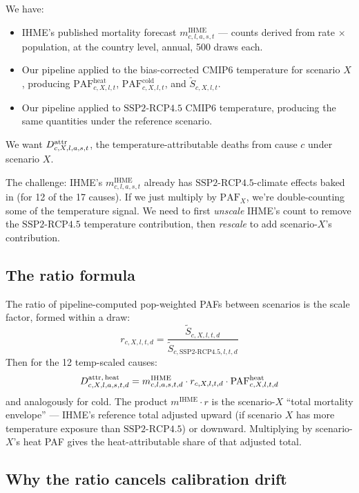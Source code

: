 \documentclass[11pt]{article}
\newcommand{\PAF}{\text{PAF}}
\newcommand{\SSPtwo}{\text{SSP2{-}RCP4.5}}
\newcommand{\mIHME}{m^{\text{IHME}}}
\begin{document}
We have:
\begin{itemize}[itemsep=2pt]
  \item IHME's published mortality forecast $\mIHME_{c,l,a,s,t}$ ---
    counts derived from rate $\times$ population, at the country level,
    annual, 500 draws each.
  \item Our pipeline applied to the bias-corrected CMIP6 temperature for
    scenario $X$, producing $\PAF^{\text{heat}}_{c,X,l,t}$,
    $\PAF^{\text{cold}}_{c,X,l,t}$, and $\tilde S_{c,X,l,t}$.
  \item Our pipeline applied to $\SSPtwo$ CMIP6 temperature, producing
    the same quantities under the reference scenario.
\end{itemize}

We want $\mAttr_{c,X,l,a,s,t}$, the temperature-attributable deaths from
cause $c$ under scenario $X$.

The challenge: IHME's $\mIHME_{c,l,a,s,t}$ already has $\SSPtwo$-climate
effects baked in (for 12 of the 17 causes). If we just multiply by
$\PAF_X$, we're double-counting some of the temperature signal. We need
to first \emph{unscale} IHME's count to remove the $\SSPtwo$ temperature
contribution, then \emph{rescale} to add scenario-$X$'s contribution.

\subsection{The ratio formula}

The ratio of pipeline-computed pop-weighted PAFs between scenarios is
the scale factor, formed within a draw:
\begin{equation}
r_{c,X,l,t,d} = \frac{\tilde S_{c,X,l,t,d}}{\tilde S_{c,\SSPtwo,l,t,d}}
\label{eq:ratio}
\end{equation}
Then for the 12 temp-scaled causes:
\begin{equation}
\mAttr[heat]_{c,X,l,a,s,t,d} = \mIHME_{c,l,a,s,t,d} \cdot r_{c,X,l,t,d} \cdot \PAF^{\text{heat}}_{c,X,l,t,d}
\label{eq:wb-12}
\end{equation}
and analogously for cold. The product $\mIHME \cdot r$ is the
scenario-$X$ ``total mortality envelope'' --- IHME's reference total
adjusted upward (if scenario $X$ has more temperature exposure than
$\SSPtwo$) or downward. Multiplying by scenario-$X$'s heat PAF gives the
heat-attributable share of that adjusted total.

\subsection{Why the ratio cancels calibration drift}
\end{document}
